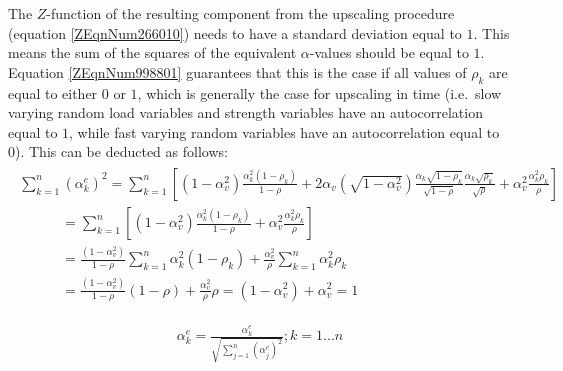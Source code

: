 {The $Z$-function of the resulting component from the upscaling procedure (equation \eqref{ZEqnNum266010}) needs to have a standard deviation equal to $1$.
This means the sum of the squares of the equivalent $\alpha$-values should be equal to $1$.
Equation \eqref{ZEqnNum998801} guarantees that this is the case if all values of $\rho_k$ are equal to either $0$ or $1$, which is generally the case for upscaling in time (i.e.\ slow varying random load variables and strength variables have an autocorrelation equal to $1$, while fast varying random variables have an autocorrelation equal to 0).
This can be deducted as follows: 
\begin{align}
\begin{array}{l} {\sum _{k=1}^{n}\left(\alpha _{k}^{e} \right)^{2}  =\sum _{k=1}^{n}\left[\left(1-\alpha _{v}^{2} \right)\frac{\alpha _{k}^{2} \left(1-\rho _{k} \right)}{1-\rho } +2\alpha _{v} \left(\sqrt{1-\alpha _{v}^{2} } \right)\frac{\alpha _{k} \sqrt{1-\rho _{k} } }{\sqrt{1-\rho } } \frac{\alpha _{k} \sqrt{\rho _{k} } }{\sqrt{\rho } } +\alpha _{v}^{2} \frac{\alpha _{k}^{2} \rho _{k} }{\rho } \right] } \\ {\quad \quad \quad    =\sum _{k=1}^{n}\left[\left(1-\alpha _{v}^{2} \right)\frac{\alpha _{k}^{2} \left(1-\rho _{k} \right)}{1-\rho } +\alpha _{v}^{2} \frac{\alpha _{k}^{2} \rho _{k} }{\rho } \right] } \\ {\quad \quad \quad    =\frac{\left(1-\alpha _{v}^{2} \right)}{1-\rho } \sum _{k=1}^{n}\alpha _{k}^{2} \left(1-\rho _{k} \right)+ \frac{\alpha _{v}^{2} }{\rho } \sum _{k=1}^{n}\alpha _{k}^{2} \rho _{k}  } \\ {\quad \quad \quad    =\frac{\left(1-\alpha _{v}^{2} \right)}{1-\rho } \left(1-\rho \right)+\frac{\alpha _{v}^{2} }{\rho } \rho =\left(1-\alpha _{v}^{2} \right)+\alpha _{v}^{2} =1} \end{array}\label{0.164)} 
\end{align}

\begin{align}
\alpha _{k}^{e} =\frac{\alpha _{k}^{e} }{\sqrt{\sum _{j=1}^{n}\left(\alpha _{j}^{e} \right)^{2}  } } ;k=1...n\label{0.165)} 
\end{align}

}
